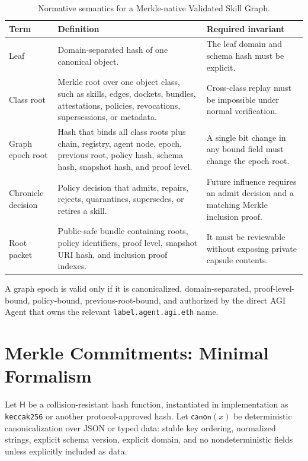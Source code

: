 \documentclass[11pt,letterpaper]{article}
\newcommand{\hash}{\mathsf{H}}
\newcommand{\canon}{\mathsf{canon}}
\begin{document}
\begin{table}[H]
\small
\centering
\begin{tabularx}{\textwidth}{p{1.35in}Y Y}
\toprule
Term & Definition & Required invariant\\
\midrule
Leaf & Domain-separated hash of one canonical object. & The leaf domain and schema hash must be explicit.\\
Class root & Merkle root over one object class, such as skills, edges, dockets, bundles, attestations, policies, revocations, supersessions, or metadata. & Cross-class replay must be impossible under normal verification.\\
Graph epoch root & Hash that binds all class roots plus chain, registry, agent node, epoch, previous root, policy hash, schema hash, snapshot hash, and proof level. & A single bit change in any bound field must change the epoch root.\\
Chronicle decision & Policy decision that admits, repairs, rejects, quarantines, supersedes, or retires a skill. & Future influence requires an admit decision and a matching Merkle inclusion proof.\\
Root packet & Public-safe bundle containing roots, policy identifiers, proof level, snapshot URI hash, and inclusion proof indexes. & It must be reviewable without exposing private capsule contents.\\
\bottomrule
\end{tabularx}
\caption{Normative semantics for a Merkle-native Validated Skill Graph.}
\end{table}

\begin{protocolbox}
A graph epoch is valid only if it is canonicalized, domain-separated, proof-level-bound, policy-bound, previous-root-bound, and authorized by the direct AGI Agent that owns the relevant \texttt{label.agent.agi.eth} name.
\end{protocolbox}

\section{Merkle Commitments: Minimal Formalism}
Let $\hash$ be a collision-resistant hash function, instantiated in implementation as \texttt{keccak256} or another protocol-approved hash. Let $\canon(x)$ be deterministic canonicalization over JSON or typed data: stable key ordering, normalized strings, explicit schema version, explicit domain, and no nondeterministic fields unless explicitly included as data.
\end{document}
